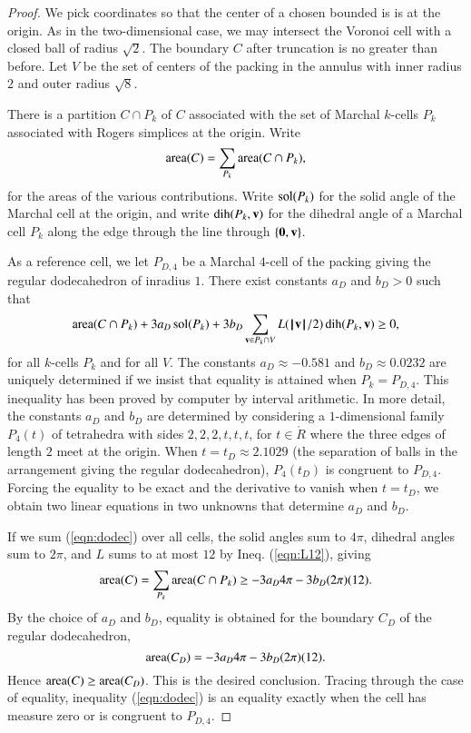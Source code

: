 \documentclass{llncs}
\def\area{\op{area}}
\begin{document}
\begin{proof}
  We pick coordinates so that the center of a chosen bounded is is at
  the origin.  As in the two-dimensional case, we may intersect the
  Voronoi cell with a closed ball of radius $\sqrt2$.  The boundary
  $C$ after truncation is no greater than before.  Let $V$ be the set
  of centers of the packing in the annulus with inner radius $2$ and
  outer radius $\sqrt8$.

There is a partition $C\cap P_k$ of  $C$ associated with the set of
Marchal $k$-cells $P_k$ associated with  Rogers simplices at the origin. 
Write 
\[
\area(C) = \sum_{P_k} \area(C\cap P_k),
\]
for the areas of the various contributions.
Write $\operatorname{sol}(P_k)$ for the solid angle of the Marchal cell at the origin, and write
$\operatorname{dih}(P_k,{\mathbf v})$ for the dihedral angle of a Marchal cell $P_k$ along the edge through
the line through $\{{\mathbf 0},{\mathbf v}\}$.  

As a reference cell, we let $P_{D,4}$ be a Marchal $4$-cell of the packing giving the
regular dodecahedron
of inradius $1$.  There exist constants $a_D$ and $b_D>0$ such
that
\begin{equation}\label{eqn:dodec}
\area(C\cap P_k) +  3 a_D \sol(P_k) + 3 b_D \sum_{\v\in P_k\cap V} L(\normo{\v}/2)\dih(P_k,\v) \ge0,
\end{equation}
for all $k$-cells $P_k$ and for all $V$.  The constants $a_D\approx -0.581$ and
$b_D\approx 0.0232$ are uniquely determined if we insist that equality
is attained when $P_k = P_{D,4}$.  This inequality has been proved by
computer by interval arithmetic.  In more detail, the constants $a_D$
and $b_D$ are determined by considering a $1$-dimensional family
$P_4(t)$ of tetrahedra with sides $2,2,2,t,t,t$, for $t\in \ring{R}$
where the three edges of length $2$ meet at the origin.  When
$t=t_D\approx 2.1029$ (the separation of balls in the arrangement
giving the regular dodecahedron), $P_4(t_D)$ is congruent to
$P_{D,4}$.  Forcing the equality to be exact and the derivative to
vanish when $t=t_D$, we obtain two linear equations in two unknowns
that determine $a_D$ and $b_D$.

If we sum (\ref{eqn:dodec}) over all cells, the solid angles sum to $4\pi$, dihedral
angles sum to $2\pi$, and $L$ sums to at most $12$ by Ineq. (\ref{eqn:L12}), giving
\[
\area(C) = \sum_{P_k}\area(C\cap P_k) \ge -3 a_D 4\pi - 3 b_D (2\pi) (12).
\]
By the choice of $a_D$ and $b_D$, equality is obtained for the boundary
$C_D$ of the regular dodecahedron, 
\[
\area(C_D) = -3 a_D 4\pi - 3 b_D (2\pi) (12).
\]
Hence $\area(C)\ge \area(C_D)$. This is the desired conclusion.  Tracing through
the case of equality, inequality (\ref{eqn:dodec}) is an equality exactly when the cell
has measure zero or is congruent to $P_{D,4}$.
\end{proof}
\end{document}
